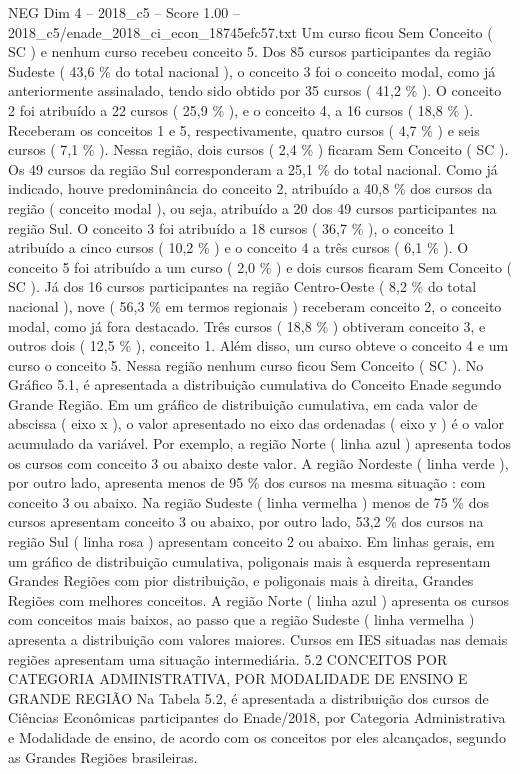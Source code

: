 \begin{textsample}{NEG Dim 4 – 2018\_c5 – Score 1.00 – 2018\_c5/enade\_2018\_ci\_econ\_18745efc57.txt}
Um curso ficou Sem Conceito ( SC ) e nenhum curso recebeu conceito 5.
Dos 85 cursos participantes da região Sudeste ( 43,6 \% do total nacional ), o conceito 3 foi o conceito modal, como já anteriormente assinalado, tendo sido obtido por 35 cursos ( 41,2 \% ).
O conceito 2 foi atribuído a 22 cursos ( 25,9 \% ), e o conceito 4, a 16 cursos ( 18,8 \% ).
Receberam os conceitos 1 e 5, respectivamente, quatro cursos ( 4,7 \% ) e seis cursos ( 7,1 \% ).
Nessa região, dois cursos ( 2,4 \% ) ficaram Sem Conceito ( SC ).
Os 49 cursos da região Sul corresponderam a 25,1 \% do total nacional.
Como já indicado, houve predominância do conceito 2, atribuído a 40,8 \% dos cursos da região ( conceito modal ), ou seja, atribuído a 20 dos 49 cursos participantes na região Sul.
O conceito 3 foi atribuído a 18 cursos ( 36,7 \% ), o conceito 1 atribuído a cinco cursos ( 10,2 \% ) e o conceito 4 a três cursos ( 6,1 \% ).
O conceito 5 foi atribuído a um curso ( 2,0 \% ) e dois cursos ficaram Sem Conceito ( SC ).
Já dos 16 cursos participantes na região Centro-Oeste ( 8,2 \% do total nacional ), nove ( 56,3 \% em termos regionais ) receberam conceito 2, o conceito modal, como já fora destacado.
Três cursos ( 18,8 \% ) obtiveram conceito 3, e outros dois ( 12,5 \% ), conceito 1.
Além disso, um curso obteve o conceito 4 e um curso o conceito 5.
Nessa região nenhum curso ficou Sem Conceito ( SC ).
No Gráfico 5.1, é apresentada a distribuição cumulativa do Conceito Enade segundo Grande Região.
Em um gráfico de distribuição cumulativa, em cada valor de abscissa ( eixo x ), o valor apresentado no eixo das ordenadas ( eixo y ) é o valor acumulado da variável.
Por exemplo, a região Norte ( linha azul ) apresenta todos os cursos com conceito 3 ou abaixo deste valor.
A região Nordeste ( linha verde ), por outro lado, apresenta menos de 95 \% dos cursos na mesma situação : com conceito 3 ou abaixo.
Na região Sudeste ( linha vermelha ) menos de 75 \% dos cursos apresentam conceito 3 ou abaixo, por outro lado, 53,2 \% dos cursos na região Sul ( linha rosa ) apresentam conceito 2 ou abaixo.
Em linhas gerais, em um gráfico de distribuição cumulativa, poligonais mais à esquerda representam Grandes Regiões com pior distribuição, e poligonais mais à direita, Grandes Regiões com melhores conceitos.
A região Norte ( linha azul ) apresenta os cursos com conceitos mais baixos, ao passo que a região Sudeste ( linha vermelha ) apresenta a distribuição com valores maiores.
Cursos em IES situadas nas demais regiões apresentam uma situação intermediária. 5.2 CONCEITOS POR CATEGORIA ADMINISTRATIVA, POR MODALIDADE DE ENSINO E GRANDE REGIÃO Na Tabela 5.2, é apresentada a distribuição dos cursos de Ciências Econômicas participantes do Enade/2018, por Categoria Administrativa e Modalidade de ensino, de acordo com os conceitos por eles alcançados, segundo as Grandes Regiões brasileiras.

\end{textsample}
